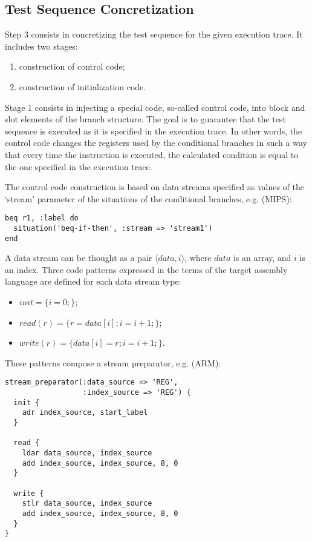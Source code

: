 \subsection{Test Sequence Concretization}

Step 3 consists in concretizing the test sequence for the given execution trace.
It includes two stages:

\begin{enumerate}
\item construction of control code;
\item construction of initialization code.
\end{enumerate}

Stage 1 consists in injecting a special code, so-called control code, into block and slot elements of the branch structure.
The goal is to guarantee that the test sequence is executed as it is specified in the execution trace.
In other words, the control code changes the registers used by the conditional branches in such a way that every time the instruction is executed,
the calculated condition is equal to the one specified in the execution trace.

The control code construction is based on data streams specified as values of the `stream' parameter of the situations of the conditional branches, e.g. (MIPS):

\begin{lstlisting}
beq r1, :label do
  situation('beq-if-then', :stream => 'stream1')
end
\end{lstlisting}

A data stream can be thought as a pair $\langle data, i \rangle$, where $data$ is an array, and $i$ is an index.
Three code patterns expressed in the terms of the target assembly language are defined for each data stream type:

\begin{itemize}
\item $init = \{ i = 0; \}$;
\item $read(r) = \{ r = data[i]; i = i + 1; \}$;
\item $write(r) = \{ data[i] = r; i = i + 1; \}$.
\end{itemize}

These patterns compose a stream preparator, e.g. (ARM):

\begin{lstlisting}
stream_preparator(:data_source => 'REG',
                  :index_source => 'REG') {
  init {
    adr index_source, start_label
  }

  read {
    ldar data_source, index_source
    add index_source, index_source, 8, 0
  }

  write {
    stlr data_source, index_source
    add index_source, index_source, 8, 0
  }
}
\end{lstlisting}

